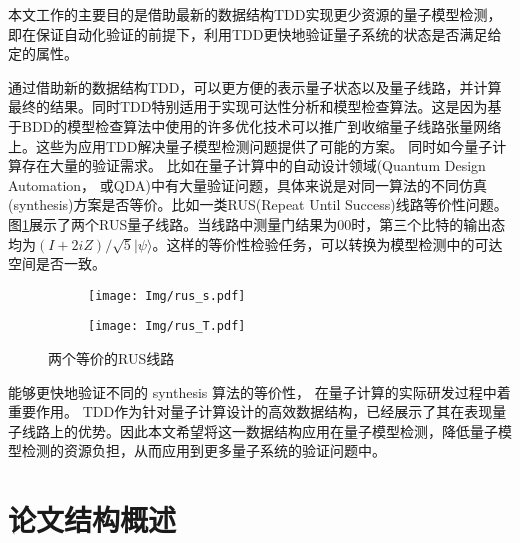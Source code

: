 本文工作的主要目的是借助最新的数据结构TDD实现更少资源的量子模型检测，即在保证自动化验证的前提下，利用TDD更快地验证量子系统的状态是否满足给定的属性。

通过借助新的数据结构TDD，可以更方便的表示量子状态以及量子线路，并计算最终的结果。同时TDD特别适用于实现可达性分析和模型检查算法。这是因为基于BDD的模型检查算法中使用的许多优化技术可以推广到收缩量子线路张量网络上\citep{Chaki_2018}。这些为应用TDD解决量子模型检测问题提供了可能的方案。
同时如今量子计算存在大量的验证需求。
比如在量子计算中的自动设计领域(Quantum Design Automation， 或QDA)中有大量验证问题，具体来说是对同一算法的不同仿真(synthesis)方案是否等价。比如一类RUS(Repeat Until Success)线路等价性问题。
图\ref{fig:rus-equal}展示了两个RUS量子线路。当线路中测量门结果为$00$时，第三个比特的输出态均为$\left(I+2iZ\right)/ \sqrt 5 |\psi\rangle$。这样的等价性检验任务，可以转换为模型检测中的可达空间是否一致。
\begin{figure}[!htbp]
	\centering
	\begin{subfigure}[b]{0.45\textwidth}
        \centering
        \texttt{[image: Img/rus\_s.pdf]}
	\end{subfigure}
	\qquad
	\begin{subfigure}[b]{0.45\textwidth}
        \centering
        \texttt{[image: Img/rus\_T.pdf]}
	\end{subfigure}
	\caption{两个等价的RUS线路\citep{Bocharov_2015}}
	\label{fig:rus-equal}
\end{figure}
能够更快地验证不同的 synthesis 算法的等价性，
在量子计算的实际研发过程中着重要作用。
TDD作为针对量子计算设计的高效数据结构，已经展示了其在表现量子线路上的优势。因此本文希望将这一数据结构应用在量子模型检测，降低量子模型检测的资源负担，从而应用到更多量子系统的验证问题中。
\section{论文结构概述}

